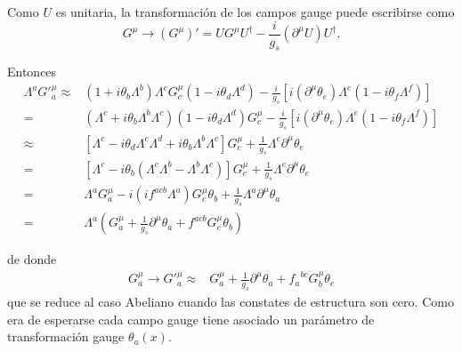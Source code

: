 \begin{frame}
Como $U$ es unitaria, la transformación de los campos gauge puede escribirse como
\begin{equation}
    {G}^\mu\to\left({G}^\mu\right)'=U{G}^\mu U^{\dagger}-\frac{i}{g_s}\left(\partial^\mu U\right)U^\dagger.
\end{equation}

Entonces
\begin{align}
\label{eq:Gmuinv}
  \Lambda^a{G'}^\mu_a\approx&(1+i\theta_b\Lambda^b)\Lambda^cG^\mu_c(1-i\theta_d\Lambda^d)-\frac{i}{g_s}[i(\partial^\mu\theta_e)\Lambda^e(1-i\theta_f\Lambda^f)]\nonumber\\
  =&(\Lambda^c+i\theta_b\Lambda^b\Lambda^c)(1-i\theta_d\Lambda^d)G^\mu_c-\frac{i}{g_s}[i(\partial^\mu\theta_e)\Lambda^e(1-i\theta_f\Lambda^f)]\nonumber\\
  \approx&[\Lambda^c-i\theta_d\Lambda^c\Lambda^d+i\theta_b\Lambda^b\Lambda^c]G^\mu_c+\frac{1}{g_s}\Lambda^e\partial^\mu\theta_e\nonumber\\
  =&[\Lambda^c-i\theta_b(\Lambda^c\Lambda^b-\Lambda^b\Lambda^c)]G^\mu_c+\frac{1}{g_s}\Lambda^e\partial^\mu\theta_e\nonumber\\
  =&\Lambda^aG^\mu_a-i(i f^{acb}\Lambda^a)G^\mu_c\theta_b+\frac{1}{g_s}\Lambda^a\partial^\mu\theta_a\nonumber\\
  =&\Lambda^a\left(G^\mu_a+\frac{1}{g_s}\partial^\mu\theta_a+f^{acb}G^\mu_c\theta_b\right)
\end{align}

de donde
\begin{align}
  \label{eq:gmutrinf}
  G^\mu_a\to {G'}^\mu_a\approx&G^\mu_a+\frac{1}{g_s}\partial^\mu\theta_a+{f_a}^{bc}G^\mu_b\theta_c
\end{align}
que se reduce al caso Abeliano cuando las constates de estructura son cero. Como era de esperarse cada campo gauge tiene asociado un parámetro de transformación gauge $\theta_a(x)$.
\end{frame}

